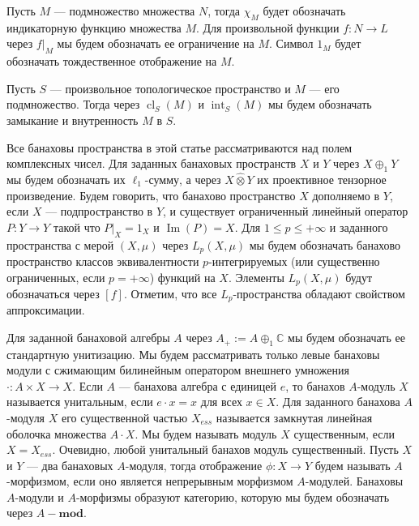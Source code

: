 \documentclass[12pt]{article}
\newcommand{\projtens}{\mathbin{\widehat{\otimes}}}
\begin{document}
Пусть $M$ --- подмножество множества $N$, тогда $\chi_M$ будет обозначать
индикаторную функцию множества $M$. Для произвольной функции $f:N\to L$ через
$f|_M$ мы будем обозначать ее ограничение на $M$. Символ $1_M$ будет обозначать
тождественное отображение на $M$.

Пусть $S$ --- произвольное топологическое пространство и $M$ --- его
подмножество. Тогда через $\operatorname{cl}_S(M)$ и $\operatorname{int}_S(M)$
мы будем обозначать замыкание и внутренность $M$ в $S$.

Все банаховы пространства в этой статье рассматриваются над полем комплексных
чисел. Для заданных банаховых пространств $X$ и $Y$ через $X\oplus_1 Y$ мы будем
обозначать их $\ell_1$-сумму, а через $X\projtens Y$ их проективное тензорное
произведение. Будем говорить, что банахово пространство $X$ дополняемо в $Y$,
если $X$ --- подпространство в $Y$, и существует ограниченный линейный оператор
$P:Y\to Y$ такой что $P|_X=1_X$ и $\operatorname{Im}(P)=X$. Для $1\leq
    p\leq+\infty$ и заданного пространства с мерой $(X,\mu)$ через $L_p(X,\mu)$ мы
будем обозначать банахово пространство классов эквивалентности $p$-интегрируемых
(или существенно ограниченных, если $p=+\infty$) функций на $X$. Элементы
$L_p(X,\mu)$ будут обозначаться через $[f]$. Отметим, что все $L_p$-пространства
обладают свойством аппроксимации.

Для заданной банаховой алгебры $A$ через $A_+:=A\oplus_1 \mathbb{C}$ мы будем
обозначать ее стандартную унитизацию. Мы будем рассматривать только левые
банаховы модули с сжимающим билинейным оператором внешнего умножения
$\cdot:A\times X\to X$. Если $A$ --- банахова алгебра с единицей $e$, то банахов
$A$-модуль $X$ называется унитальным, если $e\cdot x=x$ для всех $x\in X$. Для
заданного банахова $A$-модуля $X$ его существенной частью $X_{ess}$ называется
замкнутая линейная оболочка множества $A\cdot X$. Мы будем называть модуль $X$
существенным, если $X=X_{ess}$. Очевидно, любой унитальный банахов модуль
существенный. Пусть $X$ и $Y$ --- два банаховых $A$-модуля, тогда отображение
$\phi:X\to Y$ будем называть $A$-морфизмом, если оно является непрерывным
морфизмом $A$-модулей. Банаховы $A$-модули и $A$-морфизмы образуют категорию,
которую мы будем обозначать через $A-\mathbf{mod}$.
\end{document}
